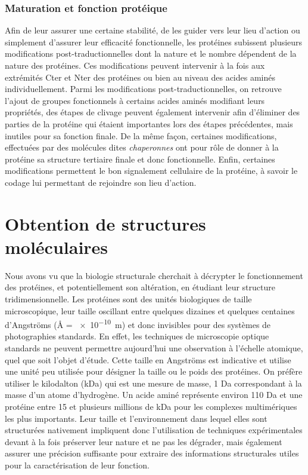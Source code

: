 \subsubsection{Maturation et fonction protéique}

Afin de leur assurer une certaine stabilité, de les guider vers leur lieu d'action ou simplement d'assurer leur efficacité fonctionnelle, les protéines subissent plusieurs modifications post-traductionnelles dont la nature et le nombre dépendent de la nature des protéines. Ces modifications peuvent intervenir à la fois aux extrémités Cter et Nter des protéines ou bien au niveau des acides aminés individuellement. Parmi les modifications post-traductionnelles, on retrouve l'ajout de groupes fonctionnels à certains acides aminés modifiant leurs propriétés, des étapes de clivage peuvent également intervenir afin d'éliminer des parties de la protéine qui étaient importantes lors des étapes précédentes, mais inutiles pour sa fonction finale. De la même façon, certaines modifications, effectuées par des molécules dites \textit{chaperonnes} ont pour rôle de donner à la protéine sa structure tertiaire finale et donc fonctionnelle. Enfin, certaines modifications permettent le bon signalement cellulaire de la protéine, à savoir le codage lui permettant de rejoindre son lieu d'action.

\section{Obtention de structures moléculaires}

Nous avons vu que la biologie structurale cherchait à décrypter le fonctionnement des protéines, et potentiellement son altération, en étudiant leur structure tridimensionnelle. Les protéines sont des unités biologiques de taille microscopique, leur taille oscillant entre quelques dizaines et quelques centaines d'Angströms (\r{A} = \SI{e-10}{\metre}) et donc invisibles pour des systèmes de photographies standards. En effet, les techniques de microscopie optique standards ne peuvent permettre aujourd'hui une observation à l'échelle atomique, quel que soit l'objet d'étude. Cette taille en Angströms est indicative et utilise une unité peu utilisée pour désigner la taille ou le poids des protéines. On préfère utiliser le kilodalton (kDa) qui est une mesure de masse, 1 Da correspondant à la masse d'un atome d'hydrogène. Un acide aminé représente environ 110 Da et une protéine entre 15 et plusieurs millions de kDa pour les complexes multimériques les plus importants. Leur taille et l'environnement dans lequel elles sont structurées nativement impliquent donc l'utilisation de techniques expérimentales devant à la fois préserver leur nature et ne pas les dégrader, mais également assurer une précision suffisante pour extraire des informations structurales utiles pour la caractérisation de leur fonction.

